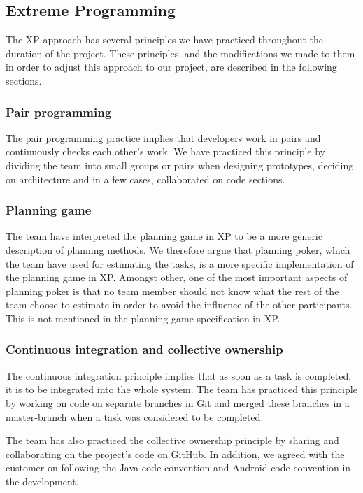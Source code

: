 \subsection{Extreme Programming}
The XP approach has several principles we have practiced throughout the duration of the project. These principles, and the modifications we made to them in order to adjust this approach to our project, are described in the following sections.

\subsubsection{Pair programming}
The pair programming practice implies that developers work in pairs and continuously checks each other's work. We have practiced this principle by dividing the team into small groups or pairs when designing prototypes, deciding on architecture and in a few cases, collaborated on code sections.


\subsubsection{Planning game}
The team have interpreted the planning game in XP to be a more generic description of planning methods. We therefore argue that planning poker, which the team have used for estimating the tasks, is a more specific implementation of the planning game in XP. Amongst other, one of the most important aspects of planning poker is that no team member should not know what the rest of the team choose to estimate in order to avoid the influence of the other participants. This is not mentioned in the planning game specification in XP.

\subsubsection{Continuous integration and collective ownership}
The continuous integration principle implies that as soon as a task is completed, it is to be integrated into the whole system. The team has practiced this principle by working on code on separate branches in Git and merged these branches in a master-branch when a task was considered to be completed.

The team has also practiced the collective ownership principle by sharing and collaborating on the project's code on GitHub. In addition, we agreed with the customer on following the Java code convention and Android code convention in the development.


